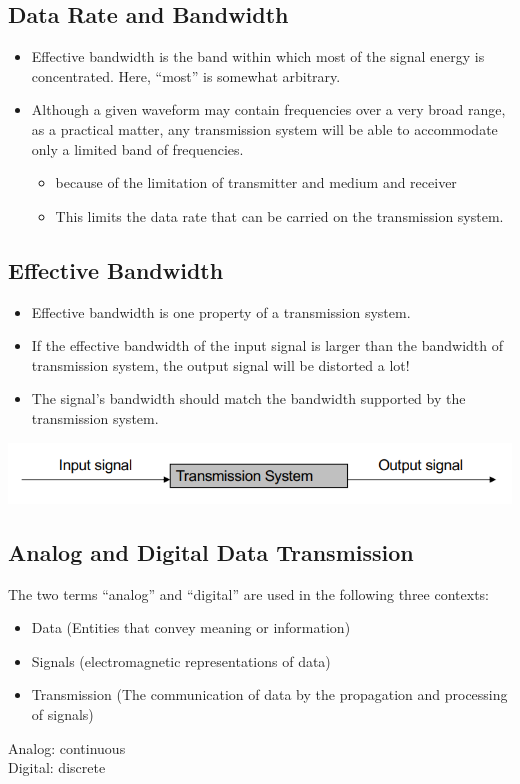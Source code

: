 \documentclass[11pt]{article}
\begin{document}
\subsection{Data Rate and Bandwidth}
\begin{itemize}
    \item Effective bandwidth is the band within which most of the signal energy is concentrated. Here, “most” is somewhat arbitrary.
    \item Although a given waveform may contain frequencies over a very broad range, as a practical matter, any transmission system will be able to accommodate only a limited band of frequencies.
    \begin{itemize}
        \item because of the limitation of transmitter and medium and receiver
        \item This limits the data rate that can be carried on the transmission system.
    \end{itemize}
\end{itemize}
\subsection{Effective Bandwidth}
\begin{itemize}
    \item Effective bandwidth is one property of a transmission system.
    \item If the effective bandwidth of the input signal is larger than the bandwidth of transmission system, the output signal will be distorted a lot!
    \item The signal’s bandwidth should match the bandwidth supported by the transmission system.
\end{itemize}

\includegraphics[width=\textwidth]{transmission-system}
\subsection{Analog and Digital Data Transmission}
The two terms “analog” and “digital” are used in the following three contexts:
\begin{itemize}
    \item Data (Entities that convey meaning or information)
    \item Signals (electromagnetic representations of data)
    \item Transmission (The communication of data by the propagation and processing of signals)
\end{itemize}
Analog: continuous \\
Digital: discrete
\end{document}
